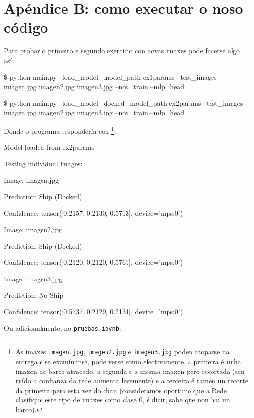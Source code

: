 \documentclass{article}
\begin{document}
\newpage
\section{Apéndice B: como executar o noso código}

Para probar o primeiro e segundo exercicio con novas imaxes pode facerse algo así:

\begin{clibox}
\$ python main.py --load\_model   --model\_path ex1params --test\_images imagen.jpg imagen2.jpg imagen3.jpg --not\_train --mlp\_head

\$ python main.py --load\_model  --docked --model\_path ex2params --test\_images imagen.jpg imagen2.jpg imagen3.jpg --not\_train --mlp\_head


\end{clibox}


Donde o programa respondería con \footnote{As imaxes \texttt{imagen.jpg}, \texttt{imagen2.jpg} e \texttt{imagen3.jpg} poden atoparse na entrega e se examínanse, pode verse como efectivamente, a primeira é unha imaxen de barco atracado, a segunda e a mesma imaxen pero recortada (sen ruído a confianza da rede aumenta levemente) e a terceira é tamén un recorte da primeira pero esta vez do chan (consideramos oportuno que a Rede clasifique este tipo de imaxes como clase 0, é dicir, sabe que non hai un barco).}:

\begin{clibox}

Model loaded from ex2params

Testing individual images:

Image: imagen.jpg

Prediction: Ship (Docked)

Confidence: tensor([0.2157, 0.2130, 0.5713], device='mps:0')

Image: imagen2.jpg

Prediction: Ship (Docked)

Confidence: tensor([0.2120, 0.2120, 0.5761], device='mps:0')

Image: imagen3.jpg

Prediction: No Ship

Confidence: tensor([0.5737, 0.2129, 0.2134], device='mps:0')
\end{clibox}

Ou adicionalmente, no \texttt{pruebas.ipynb}:
\end{document}
